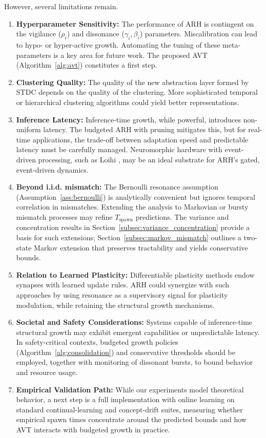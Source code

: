 \documentclass{article}
\numberwithin{figure}{section}
\numberwithin{table}{section}
\numberwithin{algorithm}{section}
\begin{document}
However, several limitations remain.
\begin{enumerate}
    \item \textbf{Hyperparameter Sensitivity:} The performance of ARH is contingent on the vigilance ($\rho_i$) and dissonance ($\gamma_i, \beta_i$) parameters. Miscalibration can lead to hypo- or hyper-active growth. Automating the tuning of these meta-parameters is a key area for future work. The proposed AVT (Algorithm~\ref{alg:avt}) constitutes a first step.
    \item \textbf{Clustering Quality:} The quality of the new abstraction layer formed by STDC depends on the quality of the clustering. More sophisticated temporal or hierarchical clustering algorithms could yield better representations.
    \item \textbf{Inference Latency:} Inference-time growth, while powerful, introduces non-uniform latency. The budgeted ARH with pruning mitigates this, but for real-time applications, the trade-off between adaptation speed and predictable latency must be carefully managed. Neuromorphic hardware with event-driven processing, such as Loihi \citep{Davies2018}, may be an ideal substrate for ARH's gated, event-driven dynamics.
    \item \textbf{Beyond i.i.d. mismatch:} The Bernoulli resonance assumption (Assumption~\ref{ass:bernoulli}) is analytically convenient but ignores temporal correlation in mismatches. Extending the analysis to Markovian or bursty mismatch processes may refine $T_{\mathrm{spawn}}$ predictions. The variance and concentration results in Section~\ref{subsec:variance_concentration} provide a basis for such extensions; Section~\ref{subsec:markov_mismatch} outlines a two-state Markov extension that preserves tractability and yields conservative bounds.
    \item \textbf{Relation to Learned Plasticity:} Differentiable plasticity methods \citep{Miconi2018} endow synapses with learned update rules. ARH could synergize with such approaches by using resonance as a supervisory signal for plasticity modulation, while retaining the structural growth mechanisms.
    \item \textbf{Societal and Safety Considerations:} Systems capable of inference-time structural growth may exhibit emergent capabilities or unpredictable latency. In safety-critical contexts, budgeted growth policies (Algorithm~\ref{alg:consolidation}) and conservative thresholds should be employed, together with monitoring of dissonant bursts, to bound behavior and resource usage.
    \item \textbf{Empirical Validation Path:} While our experiments model theoretical behavior, a next step is a full implementation with online learning on standard continual-learning and concept-drift suites, measuring whether empirical spawn times concentrate around the predicted bounds and how AVT interacts with budgeted growth in practice.
\end{enumerate}
\end{document}
